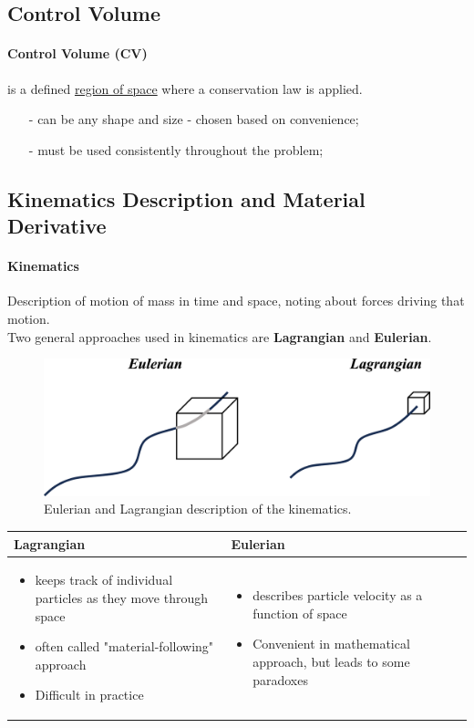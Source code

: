 \documentclass[12pt, a4paper]{article}
\begin{document}
\subsection{Control Volume}
\paragraph{Control Volume (CV)} is a defined \underline{region of space} where a conservation law is applied.
\begin{itemize}
    \item[-] can be any shape and size - chosen based on convenience;
    \item[-] must be used consistently throughout the problem;
\end{itemize}

\subsection{Kinematics Description and Material Derivative} 
\paragraph{Kinematics} Description of motion of mass in time and space, noting about forces driving that motion. \\

Two general approaches used in kinematics are \textbf{Lagrangian} and \textbf{Eulerian}.

\begin{figure}[H]
    \centering
    \includegraphics[width=.7\textwidth]{img/lagrangian_eulerian.eps}
    \caption{Eulerian and Lagrangian description of the kinematics.}
\end{figure}

\begin{table}[H]
    \centering
    \begin{tabularx}{\textwidth}{X|X}
         \textbf{Lagrangian} & \textbf{Eulerian} \\ \hline
        \begin{itemize}
           \item keeps track of individual particles as they move through space 
           \item often called "material-following" approach
           \item Difficult in practice
        \end{itemize}
        & 
        \begin{itemize}
            \item describes particle velocity as a function of space
            \item Convenient in mathematical approach, but leads to some paradoxes
        \end{itemize} 
    \end{tabularx}
\end{table}
\end{document}
